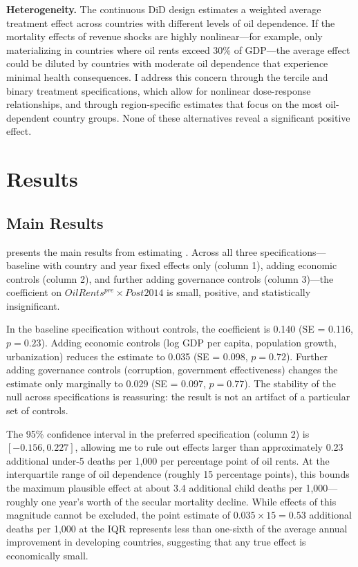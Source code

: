 \documentclass[12pt]{article}
\begin{document}
\textbf{Heterogeneity.} The continuous DiD design estimates a weighted average treatment effect across countries with different levels of oil dependence. If the mortality effects of revenue shocks are highly nonlinear---for example, only materializing in countries where oil rents exceed 30\% of GDP---the average effect could be diluted by countries with moderate oil dependence that experience minimal health consequences. I address this concern through the tercile and binary treatment specifications, which allow for nonlinear dose-response relationships, and through region-specific estimates that focus on the most oil-dependent country groups. None of these alternatives reveal a significant positive effect.


\section{Results}
\label{sec:results}

\subsection{Main Results}



 presents the main results from estimating . Across all three specifications---baseline with country and year fixed effects only (column 1), adding economic controls (column 2), and further adding governance controls (column 3)---the coefficient on $OilRents^{pre} \times Post2014$ is small, positive, and statistically insignificant.

In the baseline specification without controls, the coefficient is 0.140 (SE = 0.116, $p = 0.23$). Adding economic controls (log GDP per capita, population growth, urbanization) reduces the estimate to 0.035 (SE = 0.098, $p = 0.72$). Further adding governance controls (corruption, government effectiveness) changes the estimate only marginally to 0.029 (SE = 0.097, $p = 0.77$). The stability of the null across specifications is reassuring: the result is not an artifact of a particular set of controls.

The 95\% confidence interval in the preferred specification (column 2) is $[-0.156, 0.227]$, allowing me to rule out effects larger than approximately 0.23 additional under-5 deaths per 1,000 per percentage point of oil rents. At the interquartile range of oil dependence (roughly 15 percentage points), this bounds the maximum plausible effect at about 3.4 additional child deaths per 1,000---roughly one year's worth of the secular mortality decline. While effects of this magnitude cannot be excluded, the point estimate of $0.035 \times 15 = 0.53$ additional deaths per 1,000 at the IQR represents less than one-sixth of the average annual improvement in developing countries, suggesting that any true effect is economically small.
\end{document}

